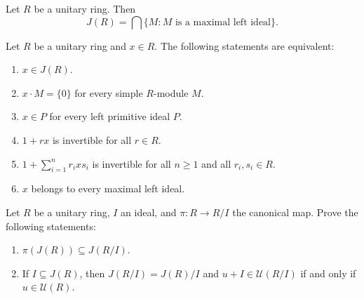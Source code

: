 \begin{exercise}
	Let $R$ be a unitary ring. Then  
	\[
	J(R)=\bigcap\{M:\text{$M$ is a maximal left ideal}\}.
	\]
\end{exercise}

\begin{exercise}
\label{xca:Jcon1}
	Let $R$ be a unitary ring and $x\in R$. The
	following statements are equivalent: 
	\begin{enumerate}
		\item $x\in J(R)$.
		\item $x\cdot M=\{0\}$ for every simple $R$-module $M$.
		\item $x\in P$ for every left primitive ideal $P$. %
		\item $1+rx$ is invertible for all $r\in R$.
		\item $1+\sum_{i=1}^n r_ixs_i$ is invertible 
		    for all $n\geq1$ and all $r_i,s_i\in R$.
		\item $x$ belongs to every maximal left ideal. 
	\end{enumerate}
\end{exercise}

\begin{exercise}
    \label{xca:quotient_radical_units}
    Let $R$ be a unitary ring, $I$ an ideal, and
    $\pi\colon R\to R/I$ the canonical map. 
    Prove the following statements:
    \begin{enumerate}
        \item $\pi(J(R))\subseteq J(R/I)$.
        \item If $I\subseteq J(R)$, then
        $J(R/I)=J(R)/I$ and 
        $u+I\in\mathcal{U}(R/I)$ if and only if 
        $u\in\mathcal{U}(R)$.
    \end{enumerate}
\end{exercise}





